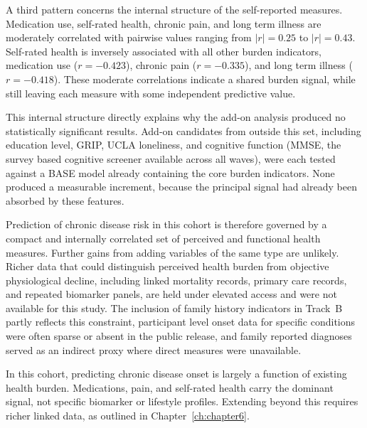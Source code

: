 A third pattern concerns the internal structure of the self-reported measures. Medication use, self-rated health, chronic pain, and long term illness are moderately correlated with pairwise values ranging from $|r| = 0.25$ to $|r| = 0.43$. Self-rated health is inversely associated with all other burden indicators, medication use ($r = -0.423$), chronic pain ($r = -0.335$), and long term illness ($r = -0.418$). These moderate correlations indicate a shared burden signal, while still leaving each measure with some independent predictive value.

This internal structure directly explains why the add-on analysis produced no statistically significant results. Add-on candidates from outside this set, including education level, \gls{GRIP}, \gls{UCLA} loneliness, and cognitive function (\gls{MMSE}, the survey based cognitive screener available across all waves), were each tested against a BASE model already containing the core burden indicators. None produced a measurable increment, because the principal signal had already been absorbed by these features.

Prediction of chronic disease risk in this cohort is therefore governed by a compact and internally correlated set of perceived and functional health measures. Further gains from adding variables of the same type are unlikely. Richer data that could distinguish perceived health burden from objective physiological decline, including linked mortality records, primary care records, and repeated biomarker panels, are held under elevated access and were not available for this study. The inclusion of family history indicators in Track~B partly reflects this constraint, participant level onset data for specific conditions were often sparse or absent in the public release, and family reported diagnoses served as an indirect proxy where direct measures were unavailable.

In this cohort, predicting chronic disease onset is largely a function of existing health burden. Medications, pain, and self-rated health carry the dominant signal, not specific biomarker or lifestyle profiles. Extending beyond this requires richer linked data, as outlined in Chapter~\ref{ch:chapter6}.